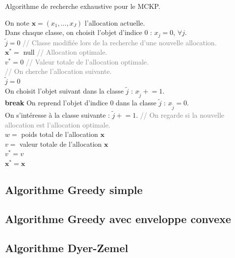 \documentclass{article}
\newcommand{\pluseq}{\mathrel{+}=}
\newcommand\comm[1]{\footnotesize\ttfamily\textcolor{gray}{// #1}}
\begin{document}
\begin{algorithm}[!ht]
\caption{Algorithme de recherche exhaustive pour le MCKP.}
\label{alg:recherche-exhaustive}
\small
{}
On note $\mathbf{x} = (x_1, \dots, x_J)$ l'allocation actuelle.\\
Dans chaque classe, on choisit l'objet d'indice 0 : $x_j = 0$, $\forall j$.\\
$\tilde{j}=0$ \comm{Classe modifiée lors de la recherche d'une nouvelle allocation.}\\
$\mathbf{x}^{*} = $ null \comm{Allocation optimale.}\\
$v^{*} = 0$ \comm{Valeur totale de l'allocation optimale.}\\
{
	\comm{On cherche l'allocation suivante.}\\
	$\tilde{j} = 0$\\
	{
		{
			On choisit l'objet suivant dans la classe $\tilde{j}$ : $x_{\tilde{j}} \pluseq 1$.\\
			\textbf{break}
		}
		{
			On reprend l'objet d'indice 0 dans la classe $\tilde{j}$ : $x_{\tilde{j}} = 0$.\\
			On s'intéresse à la classe suivante : $\tilde{j} \pluseq 1$.
		}
	}
	\comm{On regarde si la nouvelle allocation est l'allocation optimale.}\\
	$w =$ poids total de l'allocation $\mathbf{x}$\\
	{
		$v =$ valeur totale de l'allocation $\mathbf{x}$\\
		{
			$v^{*} = v$\\
			$\mathbf{x}^{*} = \mathbf{x}$\\
		}
	}
}
\end{algorithm}

\subsection{Algorithme Greedy simple}

\subsection{Algorithme Greedy avec enveloppe convexe}

\subsection{Algorithme Dyer-Zemel}
\end{document}

